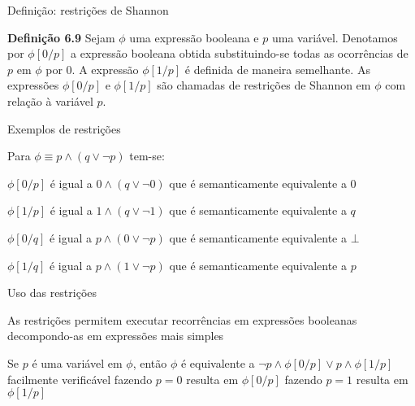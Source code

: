 \expandafter\documentclass\expandafter[table, usenames, svgnames, dvipsnames,14pt, \classopts]{beamer}
\begin{document}
\begin{frame}{Definição: restrições de Shannon}

    \begin{block}{\textbf{Definição 6.9}}
        Sejam $\phi$ uma expressão booleana e $p$ uma variável. Denotamos por $\phi[0/p]$ a expressão booleana obtida substituindo-se todas as ocorrências de $p$ em $\phi$ por $0$. A expressão $\phi[1/p]$ é definida de maneira semelhante. As expressões $\phi[0/p]$ e $\phi[1/p]$ são chamadas de restrições de Shannon em $\phi$ com relação à variável $p$.
    \end{block}

\end{frame}

\begin{frame}{Exemplos de restrições}

    Para $\phi \equiv p \land (q \lor \lnot{p})$ tem-se:

    \begin{outline}
        \1 $\phi[0/p]$ é igual a $0 \land (q \lor \lnot{0})$
            \2[-] que é semanticamente equivalente a $0$
            
        \vspace{1em}
        
        \1 $\phi[1/p]$ é igual a $1 \land (q \lor \lnot{1})$
            \2[-] que é semanticamente equivalente a $q$
            
        \vspace{1em}
        
        \1 $\phi[0/q]$ é igual a $p \land (0 \lor \lnot{p})$
            \2[-] que é semanticamente equivalente a $\bot$
            
        \vspace{1em}
        
        \1 $\phi[1/q]$ é igual a $p \land (1 \lor \lnot{p})$
            \2[-] que é semanticamente equivalente a $p$
    \end{outline}
    
\end{frame}

\begin{frame}{Uso das restrições}

    \begin{outline}
        \1 As restrições permitem executar recorrências em expressões booleanas decompondo-as em expressões mais simples
        
        \vspace{1em}
        
        \1 Se $p$ é uma variável em $\phi$, então $\phi$ é equivalente a $\lnot{p} \land \phi[0/p] \lor p \land \phi[1/p]$
            \2[-] facilmente verificável
            \2[-] fazendo $p = 0$ resulta em $\phi[0/p]$
            \2[-] fazendo $p = 1$ resulta em $\phi[1/p]$
    \end{outline}

\end{frame}
\end{document}
